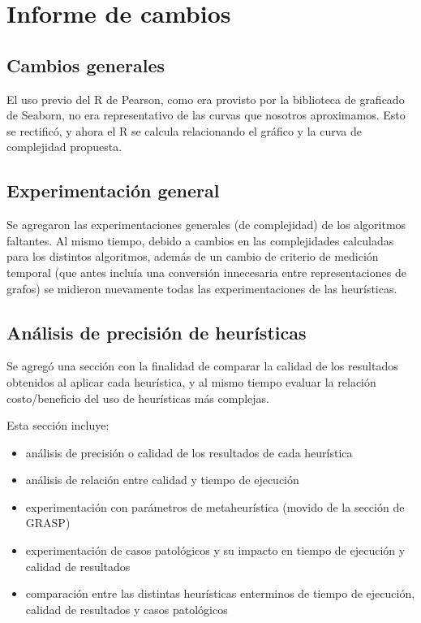\section{Informe de cambios}
	\subsection*{Cambios generales}

		El uso previo del R de Pearson, como era provisto por la biblioteca de graficado de Seaborn, no era representativo de las curvas que nosotros aproximamos. Esto se rectificó, y ahora el R se calcula relacionando el gráfico y la curva de complejidad propuesta.

	\subsection*{Experimentación general}

		Se agregaron las experimentaciones generales (de complejidad) de los algoritmos faltantes. Al mismo tiempo, debido a cambios en las complejidades calculadas para los distintos algoritmos, además de un cambio de criterio de medición temporal (que antes incluía una conversión innecesaria entre representaciones de grafos) se midieron nuevamente todas las experimentaciones de las heurísticas.

	\subsection*{Análisis de precisión de heurísticas}

		Se agregó una sección con la finalidad de comparar la calidad de los resultados obtenidos al aplicar cada heurística, y al mismo tiempo evaluar la relación costo/beneficio del uso de heurísticas más complejas.

		Esta sección incluye:

		\begin{itemize}
			\item análisis de precisión o calidad de los resultados de cada heurística

			\item análisis de relación entre calidad y tiempo de ejecución

			\item experimentación con parámetros de metaheurística (movido de la sección de GRASP)

			\item experimentación de casos patológicos y su impacto en tiempo de ejecución y calidad de resultados

			\item comparación entre las distintas heurísticas enterminos de tiempo de ejecución, calidad de resultados y casos patológicos
		\end{itemize}